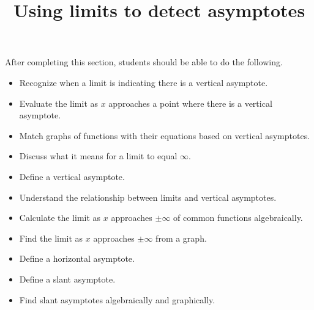 \documentclass{ximera}
\title{Using limits to detect asymptotes}
\begin{document}
\begin{abstract}
\end{abstract}

\maketitle

After completing this section, students should be able to do the following.

\begin{itemize}
	\item Recognize when a limit is indicating there is a vertical asymptote.
	\item Evaluate the limit as $x$ approaches a point where there is a vertical asymptote.
	\item Match graphs of functions with their equations based on vertical asymptotes.
	\item Discuss what it means for a limit to equal $\infty$.
	\item Define a vertical asymptote.
	\item Understand the relationship between limits and vertical asymptotes.
	\item Calculate the limit as $x$ approaches $\pm \infty$ of common functions algebraically.
	\item Find the limit as $x$ approaches $\pm \infty$ from a graph.
	\item Define a horizontal asymptote.
	\item Define a slant asymptote.
	\item Find slant asymptotes algebraically and graphically.
\end{itemize}
\end{document}
